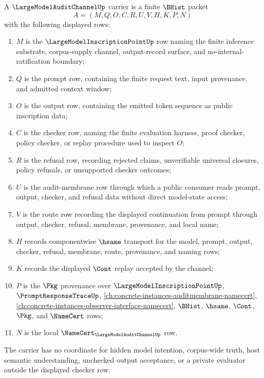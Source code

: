\begin{definition}
\label{def:large-model-audit-channel-carrier}
A $\LargeModelAuditChannelUp$ carrier is a finite $\BHist$ packet
$$
A=(M,Q,O,C,R,U,V,H,K,P,N)
$$
with the following displayed rows:
\begin{enumerate}
\item $M$ is the $\LargeModelInscriptionPointUp$ row naming the finite inference substrate, corpus-supply channel, output-record surface, and no-internal-ratification boundary;
\item $Q$ is the prompt row, containing the finite request text, input provenance, and admitted context window;
\item $O$ is the output row, containing the emitted token sequence as public inscription data;
\item $C$ is the checker row, naming the finite evaluation harness, proof checker, policy checker, or replay procedure used to inspect $O$;
\item $R$ is the refusal row, recording rejected claims, unverifiable universal closures, policy refusals, or unsupported checker outcomes;
\item $U$ is the audit-membrane row through which a public consumer reads prompt, output, checker, and refusal data without direct model-state access;
\item $V$ is the route row recording the displayed continuation from prompt through output, checker, refusal, membrane, provenance, and local name;
\item $H$ records componentwise $\hsame$ transport for the model, prompt, output, checker, refusal, membrane, route, provenance, and naming rows;
\item $K$ records the displayed $\Cont$ replay accepted by the channel;
\item $P$ is the $\Pkg$ provenance over $\LargeModelInscriptionPointUp$, $\PromptResponseTraceUp$, \autoref{ch:concrete-instances-auditmembrane-namecert}, \autoref{ch:concrete-instances-observer-interface-namecert}, $\BHist$, $\hsame$, $\Cont$, $\Pkg$, and $\NameCert$ rows;
\item $N$ is the local $\NameCert_{\LargeModelAuditChannelUp}$ row.
\end{enumerate}
The carrier has no coordinate for hidden model intention, corpus-wide truth, host semantic understanding, unchecked output acceptance, or a private evaluator outside the displayed checker row.
\end{definition}

